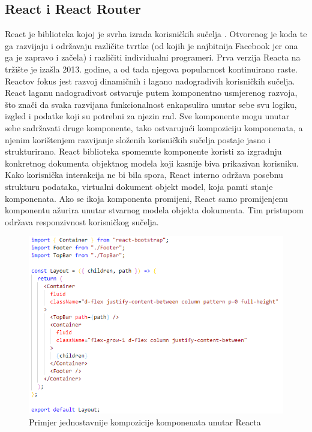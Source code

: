 \documentclass[times, utf8, zavrsni, numeric]{fer}
\begin{document}
			\subsection{React i React Router}
			React\cite{react2021} je biblioteka kojoj je svrha izrada korisničkih sučelja . Otvorenog je koda te ga razvijaju i održavaju različite tvrtke (od kojih je najbitnija Facebook jer ona ga je zapravo i začela) i različiti individualni programeri. Prva verzija Reacta na tržište je izašla 2013. godine, a od tada njegova popularnost kontinuirano raste. Reactov fokus jest razvoj dinamičnih i lagano nadogradivih korisničkih sučelja. React laganu nadogradivost ostvaruje putem komponentno usmjerenog razvoja, što znači da svaka razvijana funkcionalnost enkapsulira unutar sebe svu logiku, izgled i podatke koji su potrebni za njezin rad. Sve komponente mogu unutar sebe sadržavati druge komponente, tako ostvarujući kompoziciju  komponenata, a njenim korištenjem razvijanje složenih korisničkih sučelja postaje jasno i strukturirano. React biblioteka spomenute komponente koristi za izgradnju konkretnog dokumenta objektnog modela koji kasnije biva prikazivan korisniku. Kako korisnička interakcija ne bi bila spora, React interno održava posebnu strukturu podataka, virtualni dokument objekt model, koja pamti stanje komponenata. Ako se ikoja komponenta promijeni, React samo promijenjenu komponentu ažurira unutar stvarnog modela objekta dokumenta. Tim pristupom održava responzivnost korisničkog sučelja.\\
			\begin{figure}[H]
				\centering
				\includegraphics[scale=0.75]{pictures/prikazi/React.png}
				\caption{Primjer jednostavnije kompozicije komponenata unutar Reacta}
				\label{fig:react}
			\end{figure}
\end{document}
